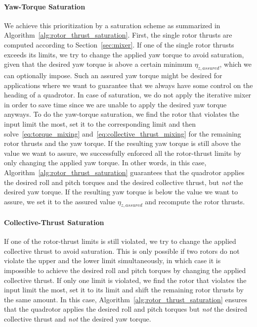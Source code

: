 \documentclass[10pt,a4paper,fleqn]{article}
\newcommand{\bodytorque}[0]{\eta}
\begin{document}
\paragraph{Yaw-Torque Saturation}

We achieve this prioritization by a saturation scheme as summarized in Algorithm~\ref{alg:rotor_thrust_saturation}.
First, the single rotor thrusts are computed according to Section~\ref{sec:mixer}.
If one of the single rotor thrusts exceeds its limits, we try to change the applied yaw torque to avoid saturation, given that the desired yaw torque is above a certain minimum $\bodytorque_{z,assured}$, which we can optionally impose.
Such an assured yaw torque might be desired for applications where we want to guarantee that we always have some control on the heading of a quadrotor.
In case of saturation, we do not apply the iterative mixer in order to save time since we are unable to apply the desired yaw torque anyways.
To do the yaw-torque saturation, we find the rotor that violates the input limit the most, set it to the corresponding limit and then solve~\eqref{eq:torque_mixing} and~\eqref{eq:collective_thrust_mixing} for the remaining rotor thrusts and the yaw torque.
If the resulting yaw torque is still above the value we want to assure, we successfully enforced all the rotor-thrust limits by only changing the applied yaw torque.
In other words, in this case, Algorithm~\ref{alg:rotor_thrust_saturation} guarantees that the quadrotor applies the desired roll and pitch torques and the desired collective thrust, but \emph{not} the desired yaw torque.
If the resulting yaw torque is below the value we want to assure, we set it to the assured value $\bodytorque_{z,assured}$ and recompute the rotor thrusts.

\paragraph{Collective-Thrust Saturation}

If one of the rotor-thrust limits is still violated, we try to change the applied collective thrust to avoid saturation.
This is only possible if two rotors do not violate the upper and the lower limit simultaneously, in which case it is impossible to achieve the desired roll and pitch torques by changing the applied collective thrust.
If only one limit is violated, we find the rotor that violates the input limit the most, set it to its limit and shift the remaining rotor thrusts by the same amount.
In this case, Algorithm~\ref{alg:rotor_thrust_saturation} ensures that the quadrotor applies the desired roll and pitch torques but \emph{not} the desired collective thrust and \emph{not} the desired yaw torque.
\end{document}
